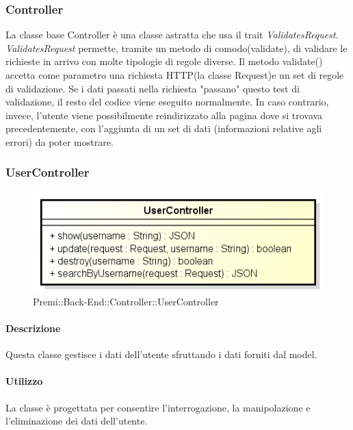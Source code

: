 \subsubsection{Controller}
La classe base Controller è una classe astratta che usa il \gls{trait} \textit{ValidatesRequest}. \\\textit{ValidatesRequest} permette, tramite un metodo di comodo(validate), di validare le richieste in arrivo con molte tipologie di regole diverse. Il metodo validate() accetta come parametro una richiesta HTTP(la classe Request)e un set di regole di validazione. Se i dati passati nella richiesta "passano" questo test di validazione, il resto del codice viene eseguito normalmente. In caso contrario, invece, l'utente viene possibilmente reindirizzato alla pagina dove si trovava precedentemente, con l'aggiunta di un set di dati (informazioni relative agli errori) da poter mostrare.


\subsubsection{UserController}
\begin{figure}[h]
\centering
\includegraphics[width=0.8\linewidth]{img/back_end_http_controllers_userController}
\caption[Premi::Back-End::Controller::UserController]{Premi::Back-End::Controller::UserController}
\label{fig:back_end_http_controllers_userController}
\end{figure}

	\paragraph{Descrizione}
		Questa classe gestisce i dati dell'utente sfruttando i dati forniti dal model.
	\paragraph{Utilizzo}
		La classe è progettata per consentire l'interrogazione, la manipolazione e l'eliminazione dei dati dell'utente.

